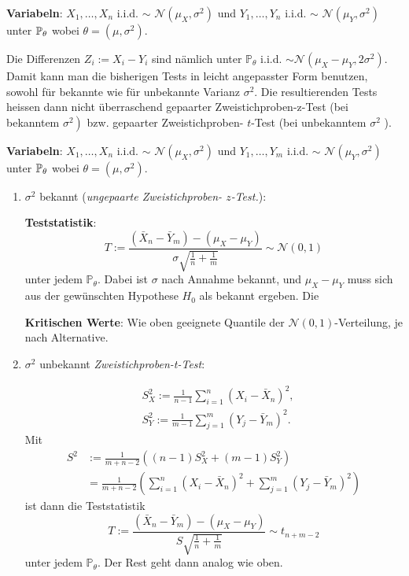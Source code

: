 
\textbf{Variabeln}: $X_1, \ldots , X_n$ i.i.d. $\sim$ $\mathcal{N}(\mu_X, \sigma^2)$ und $Y_1, \ldots , Y_n$ i.i.d. $\sim$ $\mathcal{N}(\mu_Y, \sigma^2)$ unter $\mathbb{P}_\theta$ wobei $\theta = (\mu, \sigma^2)$.

Die Differenzen $Z_{i}:=X_{i}-Y_{i}$ sind nämlich unter $\mathbb{P}_{\theta}$ i.i.d. $\sim \mathcal{N}\left(\mu_{X}-\mu_{Y}, 2 \sigma^{2}\right)$. Damit kann man die bisherigen Tests in leicht angepasster Form benutzen, sowohl für bekannte wie für unbekannte Varianz $\sigma^{2}$. Die resultierenden Tests heissen dann nicht überraschend gepaarter Zweistichproben-z-Test (bei bekanntem $\left.\sigma^{2}\right)$ bzw. gepaarter Zweistichproben- $t$-Test (bei unbekanntem $\sigma^{2}$ ).


\textbf{Variabeln}: $X_1, \ldots , X_n$ i.i.d. $\sim$ $\mathcal{N}(\mu_X, \sigma^2)$ und $Y_1, \ldots , Y_m$ i.i.d. $\sim$ $\mathcal{N}(\mu_Y, \sigma^2)$ unter $\mathbb{P}_\theta$ wobei $\theta = (\mu, \sigma^2)$.
\begin{enumerate}
    \item $\sigma^{2}$ bekannt (\textit{ungepaarte Zweistichproben- $z$-Test.}): 

    \textbf{Teststatistik}:
    $$
    T:=\frac{\left(\bar{X}_{n}-\bar{Y}_{m}\right)-\left(\mu_{X}-\mu_{Y}\right)}{\sigma \sqrt{\frac{1}{n}+\frac{1}{m}}} \sim \mathcal{N}(0,1)
    $$
    unter jedem $\mathbb{P}_{\theta}$. Dabei ist $\sigma$ nach Annahme bekannt, und $\mu_{X}-\mu_{Y}$ muss sich aus der gewünschten Hypothese $H_{0}$ als bekannt ergeben. Die 
    
    \textbf{Kritischen Werte}: Wie oben geeignete Quantile der $\mathcal{N}(0,1)$-Verteilung, je nach Alternative. 
    \item $\sigma^{2}$ unbekannt \textit{Zweistichproben-t-Test}:
    
    $$
    \begin{aligned}
    &S_{X}^{2}:=\frac{1}{n-1} \sum_{i=1}^{n}\left(X_{i}-\bar{X}_{n}\right)^{2}, \\
    &S_{Y}^{2}:=\frac{1}{m-1} \sum_{j=1}^{m}\left(Y_{j}-\bar{Y}_{m}\right)^{2} .
    \end{aligned}
    $$
    Mit
    $$
    \begin{aligned}
    S^{2} &:=\frac{1}{m+n-2}\left((n-1) S_{X}^{2}+(m-1) S_{Y}^{2}\right) \\
    &=\frac{1}{m+n-2}\left(\sum_{i=1}^{n}\left(X_{i}-\bar{X}_{n}\right)^{2}+\sum_{j=1}^{m}\left(Y_{j}-\bar{Y}_{m}\right)^{2}\right)
    \end{aligned}
    $$
    ist dann die Teststatistik
    $$
    T:=\frac{\left(\bar{X}_{n}-\bar{Y}_{m}\right)-\left(\mu_{X}-\mu_{Y}\right)}{S \sqrt{\frac{1}{n}+\frac{1}{m}}} \sim t_{n+m-2}
    $$
    unter jedem $\mathbb{P}_{\theta}$. Der Rest geht dann analog wie oben.
\end{enumerate}